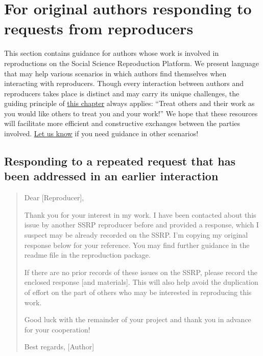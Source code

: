 \documentclass[
  openany]{book}
\begin{document}
\hypertarget{for-original-authors-responding-to-requests-from-reproducers}{%
\section{For original authors responding to requests from reproducers}\label{for-original-authors-responding-to-requests-from-reproducers}}

This section contains guidance for authors whose work is involved in reproductions on the Social Science Reproduction Platform. We present language that may help various scenarios in which authors find themselves when interacting with reproducers. Though every interaction between authors and reproducers takes place is distinct and may carry its unique challenges, the guiding principle of \href{https://bitss.github.io/ACRE/guidance-for-a-constructive-exchange-between-reproducers-and-original-authors.html}{this chapter} always applies: ``Treat others and their work as you would like others to treat you and your work!'' We hope that these resources will facilitate more efficient and constructive exchanges between the parties involved. \href{emailto:acre@berkeley.edu}{Let us know} if you need guidance in other scenarios!

\hypertarget{responding-to-a-repeated-request-that-has-been-addressed-in-an-earlier-interaction}{%
\subsection{Responding to a repeated request that has been addressed in an earlier interaction}\label{responding-to-a-repeated-request-that-has-been-addressed-in-an-earlier-interaction}}

\begin{quote}
Dear {[}Reproducer{]},

Thank you for your interest in my work. I have been contacted about this issue by another SSRP reproducer before and provided a response, which I suspect may be already recorded on the SSRP. I'm copying my original response below for your reference. You may find further guidance in the readme file in the reproduction package.

If there are no prior records of these issues on the SSRP, please record the enclosed response {[}and materials{]}. This will also help avoid the duplication of effort on the part of others who may be interested in reproducing this work.

Good luck with the remainder of your project and thank you in advance for your cooperation!

Best regards,
{[}Author{]}
\end{quote}
\end{document}
